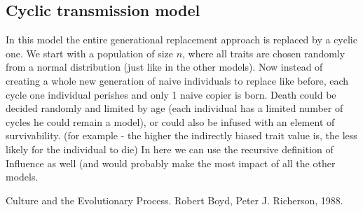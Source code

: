 \documentclass[11pt]{article}
\begin{document}
 \subsection{Cyclic transmission model}\label{cyclic model}
 In this model the entire generational replacement approach is replaced by a cyclic one. We start with a population of size $n$, where all traits are chosen randomly from a normal distribution (just like in the other models). Now instead of creating a whole new generation of naive individuals to replace like before, each cycle one individual perishes and only 1 naive copier is born.
 Death could be decided randomly and limited by age (each individual has a limited number of cycles he could remain a model), or could also be infused with an element of survivability. (for example - the higher the indirectly biased trait value is, the less likely for the individual to die)
 In here we can use the recursive definition of Influence as well (and would probably make the most impact of all the other models.
 
 \clearpage
 \begin{thebibliography}{9}
Culture and the Evolutionary Process.  
Robert Boyd, Peter J. Richerson, 1988.

\end{thebibliography}
 
\end{document}
